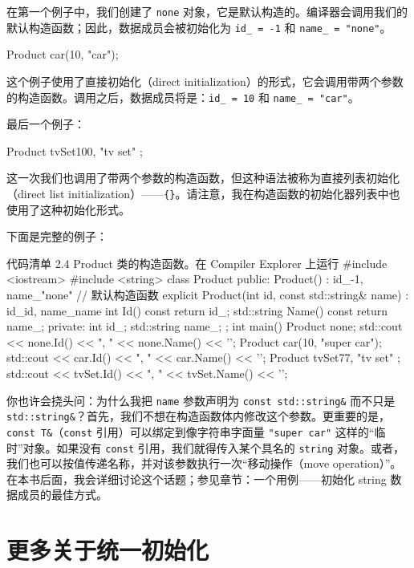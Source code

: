 在第一个例子中，我们创建了 \texttt{none} 对象，它是默认构造的。编译器会调用我们的默认构造函数；因此，数据成员会被初始化为 \texttt{id\_ = -1} 和 \texttt{name\_ = "none"}。

\begin{codebox}[cpp]
Product car(10, "car");
\end{codebox}

这个例子使用了直接初始化（direct initialization）的形式，它会调用带两个参数的构造函数。调用之后，数据成员将是：\texttt{id\_ = 10} 和 \texttt{name\_ = "car"}。

最后一个例子：

\begin{codebox}[cpp]
Product tvSet{100, "tv set" };
\end{codebox}

这一次我们也调用了带两个参数的构造函数，但这种语法被称为直接列表初始化（direct list initialization）——\texttt{\{\}}。请注意，我在构造函数的初始化器列表中也使用了这种初始化形式。

下面是完整的例子：

\begin{codeboxt}[cpp]{代码清单 2.4 Product 类的构造函数。在 Compiler Explorer 上运行}
#include <iostream>
#include <string>
class Product {
public:
Product() : id_{-1}, name_{"none"} { } // 默认构造函数
explicit Product(int id, const std::string& name)
: id_{id}, name_{name} { }
int Id() const { return id_; }
std::string Name() const { return name_; }
private:
int id_;
std::string name_;
};
int main() {
Product none;
std::cout << none.Id() << ", " << none.Name() << '\n';
Product car(10, "super car");
std::cout << car.Id() << ", " << car.Name() << '\n';
Product tvSet{77, "tv set" };
std::cout << tvSet.Id() << ", " << tvSet.Name() << '\n';
}
\end{codeboxt}

你也许会挠头问：为什么我把 \texttt{name} 参数声明为 \texttt{const std::string\&} 而不只是 \texttt{std::string\&}？首先，我们不想在构造函数体内修改这个参数。更重要的是，\texttt{const T\&}（\texttt{const} 引用）可以绑定到像字符串字面量 \texttt{"super car"} 这样的“临时”对象。如果没有 \texttt{const} 引用，我们就得传入某个具名的 \texttt{string} 对象。或者，我们也可以按值传递名称，并对该参数执行一次“移动操作（move operation）”。在本书后面，我会详细讨论这个话题；参见章节：一个用例——初始化 string 数据成员的最佳方式。

\section{更多关于统一初始化}

